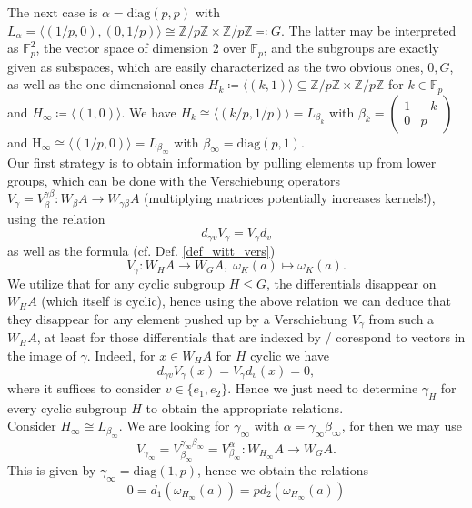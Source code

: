 \documentclass[10pt, a4paper, UKenglish]{article}
\numberwithin{equation}{section}
\newcommand{\bF}{\mathbb{F}}
\newcommand{\bZ}{\mathbb{Z}}
\newcommand{\defas}{\coloneqq}  %
\newcommand{\asdef}{\eqqcolon}      %
\renewcommand{\subset}{\subseteq}
\newcommand{\diag}{\mathrm{diag}}
\renewcommand{\H}{\mathrm{H}}
\theoremstyle{plain}
\theoremstyle{definition}
\renewcommand{\to}{\longrightarrow}
\renewcommand{\mapsto}{\longmapsto}
\begin{document}
The next case is $\alpha = \diag(p,p)$ with $L_\alpha = \langle (1/p,0), (0,1/p) \rangle \cong \bZ/p\bZ \times \bZ/p\bZ \asdef G$. The latter may be interpreted as $\bF_p^2$, the vector space of dimension 2 over $\bF_p$, and the subgroups are exactly given as subspaces, which are easily characterized as the two obvious ones, $0, G$, as well as the one-dimensional ones $H_k \defas \langle (k,1) \rangle \subset \bZ/p\bZ \times \bZ/p\bZ$ for $k \in \bF_p$ and $H_\infty \defas \langle (1,0) \rangle$. We have $H_k \cong \langle (k/p,1/p) \rangle = L_{\beta_k}$ with %
$\beta_k = \left( \begin{smallmatrix} 1 & -k \\ 0 & p \end{smallmatrix} \right)$ and $\H_\infty \cong \langle (1/p,0) \rangle = L_{\beta_\infty}$ with $\beta_\infty = \diag(p,1)$.\\
Our first strategy is to obtain information by pulling elements up from lower groups, which can be done with the Verschiebung operators $V_\gamma = V_{\beta}^{\gamma\beta}: W_\beta A \to W_{\gamma\beta} A$ (multiplying matrices potentially increases kernels!), using the relation%
\[d_{\gamma v} V_\gamma = V_\gamma d_v\]%
as well as the formula (cf. Def. \ref{def_witt_vers})
\[ V_\gamma: W_H A \to W_G A, \; \omega_K (a) \mapsto \omega_K (a). \]
We utilize that for any cyclic subgroup $H \leq G$, the differentials disappear on $W_H A$ (which itself is cyclic), hence using the above relation we can deduce that they disappear for any element pushed up by a Verschiebung $V_\gamma$ from such a $W_H A$, at least for those differentials that are indexed by / corespond to vectors in the image of $\gamma$. Indeed, for $x \in W_H A$ for $H$ cyclic we have
\begin{equation*}
	d_{\gamma v} V_\gamma (x) = V_\gamma d_v (x) = 0,
\end{equation*}
where it suffices to consider $v \in \{e_1,e_2\}$. Hence we just need to determine $\gamma_H$ for every cyclic subgroup $H$ to obtain the appropriate relations.\\
Consider $H_\infty \cong L_{\beta_\infty}$. We are looking for $\gamma_\infty$ with $\alpha = \gamma_\infty\beta_\infty$, for then we may use
\begin{equation*}
	V_{\gamma_\infty} = V_{\beta_\infty}^{\gamma_\infty\beta_\infty} = %
	V_{\beta_\infty}^{\alpha}: W_{H_\infty} A \to W_G A.
\end{equation*}
This is given by $\gamma_\infty = \diag(1,p)$, hence we obtain the relations
\begin{equation}\label{eq_group_diag(p,p)_subgroup_diag(1,p)}
	0 = d_1(\omega_{H_\infty}(a)) = p d_2 (\omega_{H_\infty}(a))
\end{equation}
\end{document}
